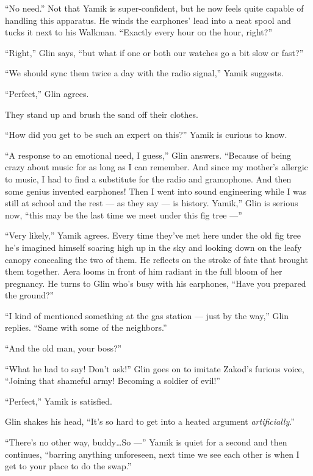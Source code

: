 \documentclass[twoside,11pt,openany]{book}
\begin{document}
``No need.'' Not that Yamik is super-confident, but he now feels quite capable of handling
this apparatus. He winds the earphones{'} lead into a neat spool and tucks it next to his Walkman. ``Exactly
every hour on the hour, right?''

``Right,'' Glin says, ``but what if one or both our watches go a bit slow or
fast?''

``We should sync them twice a day with the radio signal,'' Yamik suggests.

``Perfect,'' Glin agrees.

They stand up and brush the sand off their clothes.

``How did you get to be such an expert on this?''  Yamik is curious to know.

``A response to an emotional need, I guess,'' Glin answers. ``Because of being
crazy about music for as long as I can remember. And since my mother's allergic to music, I had to find a substitute for
the radio and gramophone. And then some genius invented earphones! Then I went into sound engineering while I was
still at school and the rest --- as they say --- is history. Yamik,'' Glin is serious now, ``this
may be the last time we meet under this fig tree ---''

``Very likely,'' Yamik agrees. Every time they've met here under the old fig tree he's
imagined himself soaring high up in the sky and looking down on the leafy canopy concealing the two of them. He
reflects on the stroke of fate that brought them together.  Aera looms in front of him radiant in the full bloom of
her pregnancy. He turns to Glin who's busy with his earphones, ``Have you prepared the
ground?''

``I kind of mentioned something at the gas station --- just by the way,'' Glin replies.
``Same with some of the neighbors.''

``And the old man, your boss?''

``What he had to say! Don't ask!'' Glin goes on to imitate Zakod's furious voice,
``Joining that shameful army! Becoming a soldier of evil!''

``Perfect,'' Yamik is satisfied.

Glin shakes his head, ``It's so hard to get into a heated argument \textit{artificially}.''

``There's no other way, buddy{\ldots}So ---'' Yamik is quiet for a second and then continues,
``barring anything unforeseen, next time we see each other is when I get to your place to do the
swap.''
\end{document}

